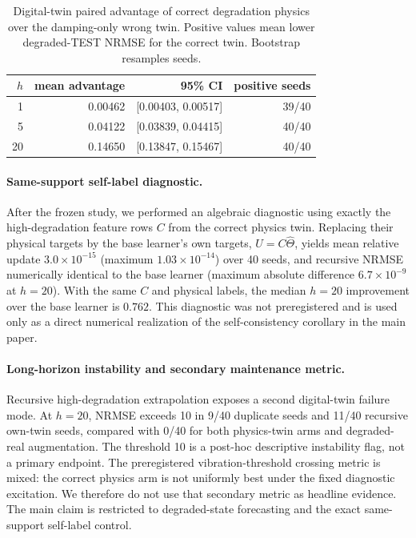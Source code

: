 \begin{table}[h]
\centering\small
\caption{Digital-twin paired advantage of correct degradation physics over the damping-only wrong twin. Positive values mean lower degraded-TEST NRMSE for the correct twin. Bootstrap resamples seeds.}
\label{tab:digital-twin}
\begin{tabular}{rrrr}
\toprule
$h$ & mean advantage & 95\% CI & positive seeds\\
\midrule
1  & 0.00462 & [0.00403, 0.00517] & 39/40\\
5  & 0.04122 & [0.03839, 0.04415] & 40/40\\
20 & 0.14650 & [0.13847, 0.15467] & 40/40\\
\bottomrule
\end{tabular}
\end{table}

\paragraph{Same-support self-label diagnostic.}
After the frozen study, we performed an algebraic diagnostic using exactly the high-degradation feature rows $C$ from the correct physics twin. Replacing their physical targets by the base learner's own targets, $U=C\widehat\Theta$, yields mean relative update $3.0\times10^{-15}$ (maximum $1.03\times10^{-14}$) over 40 seeds, and recursive NRMSE numerically identical to the base learner (maximum absolute difference $6.7\times10^{-9}$ at $h=20$). With the same $C$ and physical labels, the median $h=20$ improvement over the base learner is $0.762$. This diagnostic was not preregistered and is used only as a direct numerical realization of the self-consistency corollary in the main paper.

\paragraph{Long-horizon instability and secondary maintenance metric.}
Recursive high-degradation extrapolation exposes a second digital-twin failure mode. At $h=20$, NRMSE exceeds 10 in 9/40 duplicate seeds and 11/40 recursive own-twin seeds, compared with 0/40 for both physics-twin arms and degraded-real augmentation. The threshold 10 is a post-hoc descriptive instability flag, not a primary endpoint. The preregistered vibration-threshold crossing metric is mixed: the correct physics arm is not uniformly best under the fixed diagnostic excitation. We therefore do not use that secondary metric as headline evidence. The main claim is restricted to degraded-state forecasting and the exact same-support self-label control.

